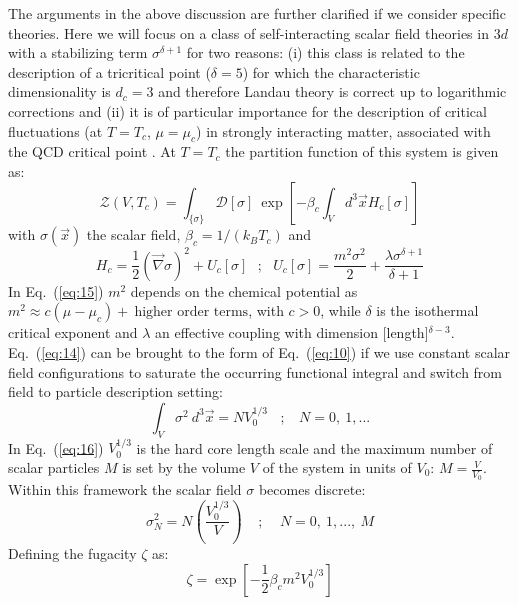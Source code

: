 \documentclass[aps,pre,showpacs,amsmath,amssymb,superscriptaddress,twocolumn]{revtex4-1}
\begin{document}
The arguments in the above discussion are further clarified if we consider specific theories. Here we will focus on a class of self-interacting scalar field theories in $3d$ with a stabilizing term $\sigma^{\delta + 1}$ for two reasons: (i) this class is related to the description of a tricritical point ($\delta = 5$) for which the characteristic dimensionality is $d_c=3$ and therefore Landau theory is correct up to logarithmic corrections \cite{Pfeuty1977} and (ii) it is of particular importance for the description of critical fluctuations (at $T=T_c$, $\mu=\mu_c$) in strongly interacting matter, associated with the QCD critical point \cite{Antoniou2006}. At $T=T_c$ the partition function of this system is given as: 
\begin{equation}
\mathcal{Z}(V,T_c)=\displaystyle{\int_{\{\sigma \}}} \mathcal{D}[\sigma]~\exp[-{\displaystyle{\beta_c \int_V d^3\vec{x} H_{c}[\sigma]}}]
\label{eq:14}
\end{equation}
with $\sigma(\vec{x})$ the scalar field, $\beta_c=1/(k_B T_c)$ and
\begin{equation}
H_{c}=\frac{1}{2} (\vec{\nabla} \sigma)^2 + U_{c}[\sigma]~~~;~~~U_{c}[\sigma]=\frac{m^2 \sigma^2}{2}   + \frac{\lambda \sigma^{\delta + 1}}{\delta +1} 
\label{eq:15}
\end{equation}
In Eq.~(\ref{eq:15}) $m^2$ depends on the chemical potential as $m^2 \approx c (\mu - \mu_c) + ~ \textrm{higher~order~terms}$, with $c > 0$, while $\delta$ is the isothermal critical exponent and $\lambda$ an effective coupling with dimension [length]$^{\delta - 3}$. Eq.~(\ref{eq:14}) can be brought to the form of Eq.~(\ref{eq:10}) if we use constant scalar field configurations to saturate the occurring functional integral and switch from field to particle description setting:
\begin{equation}
\int_V \sigma^2~d^3\vec{x} = N V_0^{1/3}~~~~;~~~~N=0,~1,...
\label{eq:16}
\end{equation}
In Eq.~(\ref{eq:16}) $V_0^{1/3}$ is the hard core length scale and the maximum number of scalar particles $M$ is set by the volume $V$ of the system in units of $V_0$: $M=\frac{V}{V_0}$. Within this framework the scalar field $\sigma$ becomes discrete:
\begin{equation}
\sigma^2_N=N \left(\frac{V_0^{1/3}}{V}\right)~~~~~;~~~~~N=0,~1,...,~M
\label{eq:17}
\end{equation}
Defining the fugacity $\zeta$ as:
\begin{equation}
\zeta=\exp[-\frac{1}{2}\beta_c m^2 V_0^{1/3}]
\label{eq:18}
\end{equation}
\end{document}
